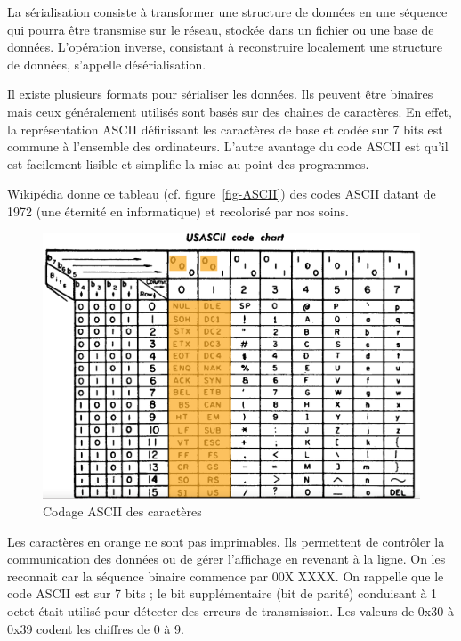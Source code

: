 La sérialisation consiste à transformer une structure de données en une séquence qui pourra être transmise sur le réseau, stockée dans un fichier ou une base de données. L'opération inverse, consistant à reconstruire localement une structure de données, s'appelle désérialisation. 

Il existe plusieurs formats pour sérialiser les données. Ils peuvent être binaires mais ceux généralement utilisés sont basés sur des chaînes de caractères. En effet, la représentation \ac{ASCII} définissant les caractères de base et codée sur 7 bits est commune à l'ensemble des ordinateurs. L'autre avantage du code ASCII est qu'il est facilement lisible et simplifie la mise au point des programmes.  

Wikipédia donne ce tableau (cf. figure~\vref{fig-ASCII}) des codes \ac{ASCII} datant de 1972 (une éternité en informatique) et recolorisé par nos soins.

\begin{figure}[tbp]
\centerline{\includegraphics[width=1\columnwidth]{Pictures/Capture20.png}}
\caption{Codage ASCII des caractères}
\label{fig-ASCII}
\end{figure}

Les caractères en orange ne sont pas imprimables. Ils permettent de contrôler la communication des données ou de gérer l'affichage en revenant à la ligne. On les reconnait car la séquence binaire commence par 00X XXXX. On rappelle que le code ASCII est sur 7 bits ; le bit supplémentaire (bit de parité) conduisant à 1 octet était utilisé pour détecter des erreurs de transmission. Les valeurs de 0x30 à 0x39 codent les chiffres de 0 à 9. 

